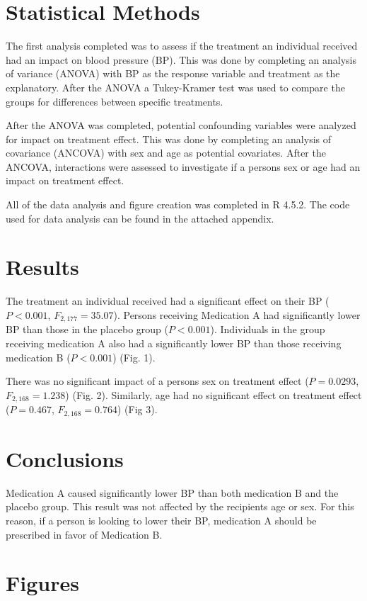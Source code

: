 \documentclass {article}
\begin{document}
\section {Statistical Methods}
The first analysis completed was to assess if the treatment an individual received had an impact on blood pressure (BP). This was done by completing an analysis of variance (ANOVA) with BP as the response variable and treatment as the explanatory. After the ANOVA a Tukey-Kramer test was used to compare the groups for differences between specific treatments.

After the ANOVA was completed, potential confounding variables were analyzed for impact on treatment effect. This was done by completing an analysis of covariance (ANCOVA) with sex and age as potential covariates. After the ANCOVA, interactions were assessed to investigate if a persons sex or age had an impact on treatment effect.

All of the data analysis and figure creation was completed in R 4.5.2. The code used for data analysis can be found in the attached appendix.

\section {Results}
The treatment an individual received had a significant effect on their BP ($P < 0.001$, $F_{2, 177} = 35.07$). Persons receiving Medication A had significantly lower BP than those in the placebo group ($P < 0.001$). Individuals in the group receiving medication A also had a significantly lower BP than those receiving medication B ($P < 0.001$) (Fig. 1).

There was no significant impact of a persons sex on treatment effect ($P = 0.0293$, $F_{2, 168} = 1.238$) (Fig. 2). Similarly, age had no significant effect on treatment effect ($P = 0.467$, $F_{2, 168} = 0.764$) (Fig 3). 


\section {Conclusions}
Medication A caused significantly lower BP than both medication B and the placebo group. This result was not affected by the recipients age or sex. For this reason, if a person is looking to lower their BP, medication A should be prescribed in favor of Medication B.
\pagebreak
\section{Figures}
\end{document}
